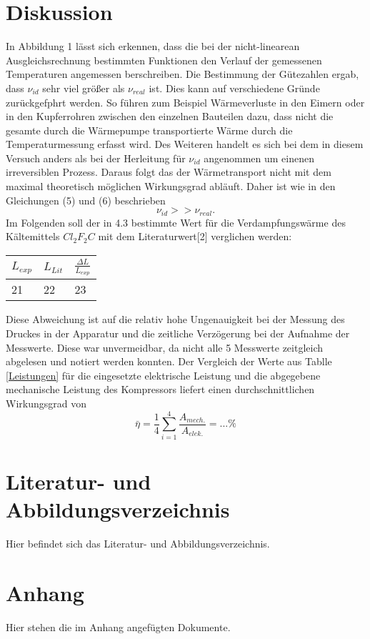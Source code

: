 \documentclass[11pt]{article}
\begin{document}
\section{Diskussion}
In Abbildung 1 lässt sich erkennen, dass die bei der nicht-linearean Ausgleichsrechnung bestimmten Funktionen den Verlauf der gemessenen Temperaturen angemessen berschreiben. 
Die Bestimmung der Gütezahlen ergab, dass $\nu_{id}$ sehr viel größer als $\nu_{real}$ ist. Dies kann auf verschiedene Gründe zurückgefphrt werden. So führen zum Beispiel Wärmeverluste in den Eimern oder in den Kupferrohren zwischen den einzelnen Bauteilen dazu, dass nicht die gesamte durch die Wärmepumpe transportierte Wärme durch die Temperaturmessung erfasst wird. Des Weiteren handelt es sich bei dem in diesem Versuch anders als bei der Herleitung für $\nu_{id}$ angenommen um einenen irreversiblen Prozess. Daraus folgt das der Wärmetransport nicht mit dem maximal theoretisch möglichen Wirkungsgrad abläuft. Daher ist wie in den Gleichungen (5) und (6) beschrieben
\[\nu_{id} >> \nu_{real}.\]
Im Folgenden soll der in 4.3 bestimmte Wert für die Verdampfungswärme des Kältemittels $Cl_2F_2C$ mit dem Literaturwert[2] verglichen werden:
\begin{table}[H]
\centering
\begin{tabular}{l|l|l}

	$L_{exp}$ & $L_{Lit}$ & $\frac{\Delta L}{L_{exp}}$ \\
	\hline
	21 & 22 & 23 \\
\end{tabular}
\end{table}\noindent
Diese Abweichung ist auf die relativ hohe Ungenauigkeit bei der Messung des Druckes in der Apparatur und die zeitliche Verzögerung bei der Aufnahme der Messwerte. Diese war unvermeidbar, da nicht alle 5 Messwerte zeitgleich abgelesen und notiert werden konnten.
Der Vergleich der Werte aus Tablle \ref{Leistungen} für die eingesetzte elektrische Leistung und die abgegebene mechanische Leistung des Kompressors liefert einen durchschnittlichen Wirkungsgrad von
\begin{equation}
\bar \eta  = \frac 14 \sum_{i=1}^{4}\frac{A_{mech.}}{A_{elek.}} = ...\%
\end{equation}

\section{Literatur- und Abbildungsverzeichnis}
Hier befindet sich das Literatur- und Abbildungsverzeichnis.
\section{Anhang}
Hier stehen die im Anhang angefügten Dokumente.
\end{document}
